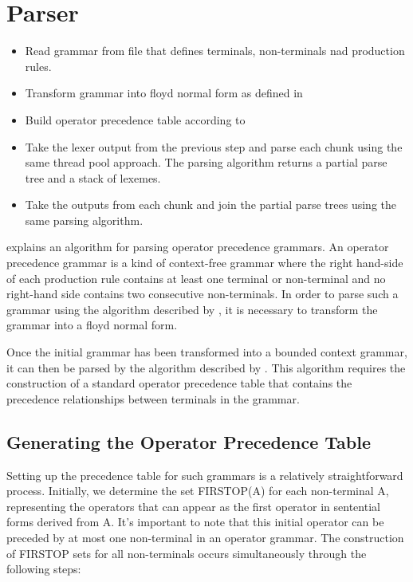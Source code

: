 \section{Parser}
\begin{itemize}
	\item Read grammar from file that defines terminals, non-terminals nad production rules.
	\item Transform grammar into floyd normal form as defined in \cite{barenghi_parallel_2015}
	\item Build operator precedence table according to \cite{grune_parsing_2008}
	\item Take the lexer output from the previous step and parse each chunk using the same
  		  thread pool approach. The parsing algorithm returns a partial parse tree and a stack of lexemes.
	\item Take the outputs from each chunk and join the partial parse trees using
  		  the same parsing algorithm.
\end{itemize}

\cite{barenghi_parallel_2015} explains an algorithm for parsing operator
precedence grammars. An operator precedence grammar is a kind of context-free
grammar  where the right hand-side of each production rule contains at least
one terminal or non-terminal and no right-hand side contains two consecutive
non-terminals. In order to parse such a grammar using the algorithm described by
\cite{barenghi_parallel_2015}, it is necessary to transform the grammar into a
floyd normal form.

Once the initial grammar has been transformed into a bounded context grammar, it
can then be parsed by the algorithm described by \cite{barenghi_parallel_2015}.
This algorithm requires the construction of a standard operator precedence table
that contains the precedence relationships between terminals in the grammar.

\subsection{Generating the Operator Precedence Table}

Setting up the precedence table for such grammars is a relatively
straightforward process. Initially, we determine the set FIRSTOP(A) for each
non-terminal A, representing the operators that can appear as the first operator
in sentential forms derived from A. It's important to note that this initial
operator can be preceded by at most one non-terminal in an operator grammar. The
construction of FIRSTOP sets for all non-terminals occurs simultaneously through
the following steps:

